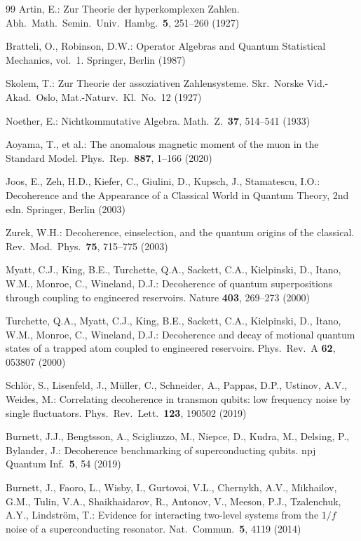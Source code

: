 \documentclass[11pt]{article}
\theoremstyle{remark}
\begin{document}
\begin{thebibliography}{99}
 Artin, E.: Zur Theorie der hyperkomplexen Zahlen. Abh.\ Math.\ Semin.\ Univ.\ Hambg.\ \textbf{5}, 251--260 (1927)

 Bratteli, O., Robinson, D.W.: Operator Algebras and Quantum Statistical Mechanics, vol.~1. Springer, Berlin (1987)

 Skolem, T.: Zur Theorie der assoziativen Zahlensysteme. Skr.\ Norske Vid.-Akad.\ Oslo, Mat.-Naturv.\ Kl.\ No.~12 (1927)

 Noether, E.: Nichtkommutative Algebra. Math.\ Z.\ \textbf{37}, 514--541 (1933)

 Aoyama, T., et al.: The anomalous magnetic moment of the muon in the Standard Model. Phys.\ Rep.\ \textbf{887}, 1--166 (2020)

 Joos, E., Zeh, H.D., Kiefer, C., Giulini, D., Kupsch, J., Stamatescu, I.O.: Decoherence and the Appearance of a Classical World in Quantum Theory, 2nd edn. Springer, Berlin (2003)

 Zurek, W.H.: Decoherence, einselection, and the quantum origins of the classical. Rev.\ Mod.\ Phys.\ \textbf{75}, 715--775 (2003)

 Myatt, C.J., King, B.E., Turchette, Q.A., Sackett, C.A., Kielpinski, D., Itano, W.M., Monroe, C., Wineland, D.J.: Decoherence of quantum superpositions through coupling to engineered reservoirs. Nature \textbf{403}, 269--273 (2000)

 Turchette, Q.A., Myatt, C.J., King, B.E., Sackett, C.A., Kielpinski, D., Itano, W.M., Monroe, C., Wineland, D.J.: Decoherence and decay of motional quantum states of a trapped atom coupled to engineered reservoirs. Phys.\ Rev.\ A \textbf{62}, 053807 (2000)

 Schl\"or, S., Lisenfeld, J., M\"uller, C., Schneider, A., Pappas, D.P., Ustinov, A.V., Weides, M.: Correlating decoherence in transmon qubits: low frequency noise by single fluctuators. Phys.\ Rev.\ Lett.\ \textbf{123}, 190502 (2019)

 Burnett, J.J., Bengtsson, A., Scigliuzzo, M., Niepce, D., Kudra, M., Delsing, P., Bylander, J.: Decoherence benchmarking of superconducting qubits. npj Quantum Inf.\ \textbf{5}, 54 (2019)

 Burnett, J., Faoro, L., Wisby, I., Gurtovoi, V.L., Chernykh, A.V., Mikhailov, G.M., Tulin, V.A., Shaikhaidarov, R., Antonov, V., Meeson, P.J., Tzalenchuk, A.Y., Lindstr\"om, T.: Evidence for interacting two-level systems from the $1/f$ noise of a superconducting resonator. Nat.\ Commun.\ \textbf{5}, 4119 (2014)


\end{thebibliography}
\end{document}
